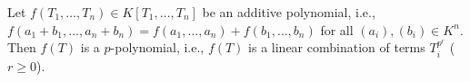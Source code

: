 Let $f(T_1, \ldots, T_n) \in K[T_1, \ldots, T_n]$ be an additive polynomial, i.e., $f(a_1 + b_1, \ldots, a_n + b_n) = f(a_1, \ldots, a_n) + f(b_1, \ldots, b_n)$ for all $(a_i), (b_i) \in K^n$. Then $f(T)$ is a $p$-polynomial, i.e., $f(T)$ is a linear combination of terms $T_i^{p^r}$ ($r \geqslant 0$).
